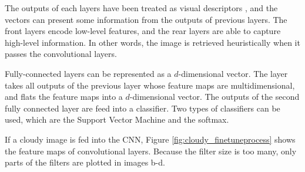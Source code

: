 The outputs of each layers have been treated as visual descriptors \citep{razavian2014cnn}, and the vectors can present some information from the outputs of previous layers. The front layers encode low-level features, and the rear layers are able to capture high-level information. In other words, the image is retrieved heuristically when it passes the convolutional layers.

Fully-connected layers can be represented as a $d$-dimensional vector. The layer takes all outputs of the previous layer  whose feature maps are multidimensional, and flats the feature maps into a $d$-dimensional vector. The outputs of the second fully connected layer are feed into a classifier. Two types of classifiers can be used, which are the Support Vector Machine and the softmax.

If a cloudy image is fed into the CNN, Figure \ref{fig:cloudy_finetuneprocess} shows the feature maps of convolutional layers. Because the filter size is too many, only parts of the filters are plotted in images b-d.

\graphicspath{ {./Figures/DifferentLayers/} }

